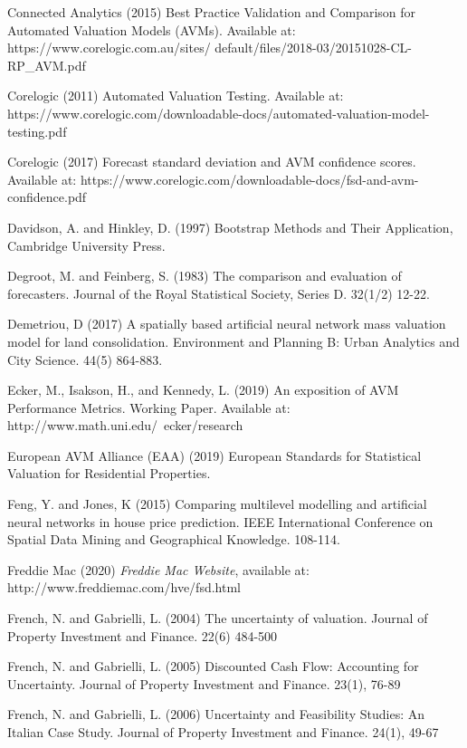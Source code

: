 \documentclass[colTwo]{format}
\theoremstyle{definition}
\begin{document}
\begin{thebibliography}{50}
\harvarditem{}{}{}Connected Analytics (2015) Best Practice Validation and Comparison for Automated Valuation Models (AVMs). Available at: https://www.corelogic.com.au/sites/ default/files/2018-03/20151028-CL-RP\_AVM.pdf

\harvarditem{}{}{}Corelogic (2011) Automated Valuation Testing. Available at: https://www.corelogic.com/downloadable-docs/automated-valuation-model-testing.pdf
		
\harvarditem{}{}{}Corelogic (2017) Forecast standard deviation and AVM confidence scores. Available at: https://www.corelogic.com/downloadable-docs/fsd-and-avm-confidence.pdf

\harvarditem{}{}{}Davidson, A. and Hinkley, D. (1997) Bootstrap Methods and Their Application, Cambridge University Press.  

\harvarditem{}{}{}Degroot, M. and Feinberg, S. (1983) The comparison and evaluation of forecasters. Journal of the Royal Statistical Society, Series D. 32(1/2) 12-22.

\harvarditem{}{}{}Demetriou, D (2017) A spatially based artificial neural network mass valuation model for land consolidation. Environment and Planning B: Urban Analytics and City Science. 44(5) 864-883. 

\harvarditem{}{}{}Ecker, M., Isakson, H., and Kennedy, L. (2019) An exposition of AVM Performance Metrics.  Working Paper.  Available at: http://www.math.uni.edu/~ecker/research

\harvarditem{}{}{}European AVM Alliance (EAA) (2019) European Standards for Statistical Valuation for Residential Properties. 

\harvarditem{}{}{}Feng, Y. and Jones, K (2015) Comparing multilevel modelling and artificial neural networks in house price prediction. IEEE International Conference on Spatial Data Mining and Geographical Knowledge. 108-114.

\harvarditem{}{}{}Freddie Mac (2020) \textit{Freddie Mac Website}, available at: http://www.freddiemac.com/hve/fsd.html

\harvarditem{}{}{}French, N. and Gabrielli, L. (2004) The uncertainty of valuation.  Journal of Property Investment and Finance. 22(6) 484-500

\harvarditem{}{}{}French, N. and Gabrielli, L. (2005) Discounted Cash Flow: Accounting for Uncertainty.  Journal of Property Investment and Finance. 23(1), 76-89

\harvarditem{}{}{}French, N. and Gabrielli, L. (2006) Uncertainty and Feasibility Studies: An Italian Case Study.  Journal of Property Investment and Finance. 24(1), 49-67


\end{thebibliography}
\end{document}
